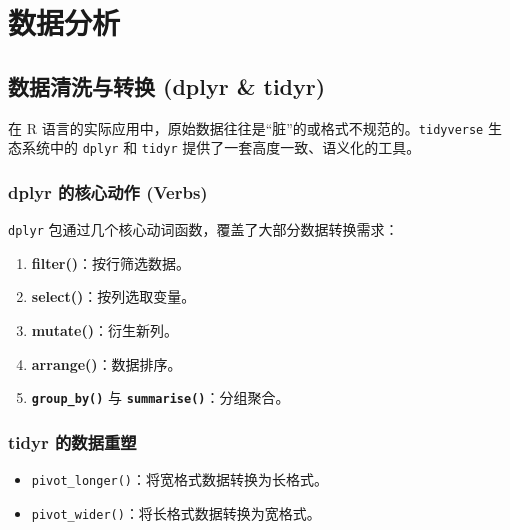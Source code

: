 \chapter{数据分析}
\section{数据清洗与转换 (dplyr \& tidyr)}

在 R 语言的实际应用中，原始数据往往是“脏”的或格式不规范的。\texttt{tidyverse} 生态系统中的 \texttt{dplyr} 和 \texttt{tidyr} 提供了一套高度一致、语义化的工具。

\subsection{dplyr 的核心动作 (Verbs)}
\texttt{dplyr} 包通过几个核心动词函数，覆盖了大部分数据转换需求：

\begin{enumerate}[label=\arabic*., leftmargin=2em]
    \item \textbf{filter()}：按行筛选数据。
    \item \textbf{select()}：按列选取变量。
    \item \textbf{mutate()}：衍生新列。
    \item \textbf{arrange()}：数据排序。
    \item \textbf{\texttt{group\_by()}} 与 \textbf{\texttt{summarise()}}：分组聚合。
\end{enumerate}

\subsection{tidyr 的数据重塑}
\begin{itemize}
    \item \texttt{pivot\_longer()}：将宽格式数据转换为长格式。
    \item \texttt{pivot\_wider()}：将长格式数据转换为宽格式。
\end{itemize}



